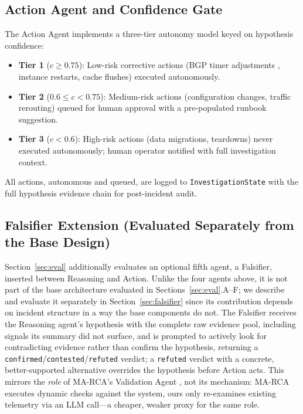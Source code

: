 \documentclass[10pt,conference]{IEEEtran}
\begin{document}
\subsection{Action Agent and Confidence Gate}
The Action Agent implements a three-tier autonomy model keyed on hypothesis
confidence:
\begin{itemize}
  \item \textbf{Tier 1} ($c \geq 0.75$): Low-risk corrective actions (BGP
  timer adjustments \cite{bjorklund2011netconf}, instance restarts, cache
  flushes) executed autonomously.
  \item \textbf{Tier 2} ($0.6 \leq c < 0.75$): Medium-risk actions
  (configuration changes, traffic rerouting) queued for human approval with a
  pre-populated runbook suggestion.
  \item \textbf{Tier 3} ($c < 0.6$): High-risk actions (data migrations,
  teardowns) never executed autonomously; human operator notified with full
  investigation context.
\end{itemize}
All actions, autonomous and queued, are logged to
\texttt{InvestigationState} with the full hypothesis evidence chain for
post-incident audit.

\subsection{Falsifier Extension (Evaluated Separately from the Base Design)}
\label{sec:falsifier-arch}
Section~\ref{sec:eval} additionally evaluates an optional fifth agent, a
Falsifier, inserted between Reasoning and Action. Unlike the four agents
above, it is not part of the base architecture evaluated in
Sections~\ref{sec:eval}.A--F; we describe and evaluate it
separately in Section~\ref{sec:falsifier} since its contribution depends on
incident structure in a way the base components do not. The Falsifier
receives the Reasoning agent's hypothesis with the complete raw evidence
pool, including signals its summary did not surface, and is prompted to
actively look for contradicting evidence rather than confirm the
hypothesis, returning a
\texttt{confirmed}/\texttt{contested}/\texttt{refuted} verdict; a
\texttt{refuted} verdict with a concrete, better-supported alternative
overrides the hypothesis before Action acts. This mirrors the \emph{role}
of MA-RCA's Validation Agent \cite{fu2026marca}, not its mechanism: MA-RCA
executes dynamic checks against the system, ours only re-examines existing
telemetry via an LLM call---a cheaper, weaker proxy for the same role.
\end{document}
